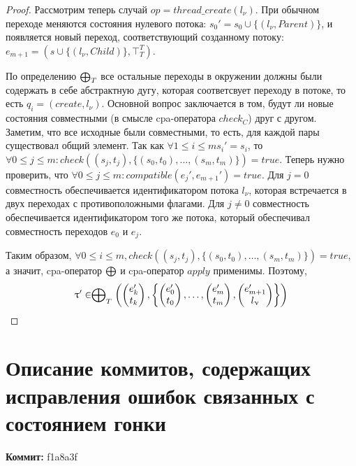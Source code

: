 \begin{proof}
Рассмотрим теперь случай $op = thread\_create(l_{\nu})$.
При обычном переходе меняются состояния нулевого потока: $s_0' = s_0 \cup \{(l_{\nu}, Parent)\}$, и появляется новый переход, соответствующий созданному потоку: $e_{m+1} = (s \cup \{(l_{\nu}, Child)\} , \top^T_T)$.

По определению $\mathrel{\bigoplus}_T$ все остальные переходы в окружении должны были содержать в себе абстрактную дугу, которая соответсвует переходу в потоке, то есть $q_i = (create, l_{\nu})$.
Основной вопрос заключается в том, будут ли новые состояния совместными (в смысле cpa-оператора $check_{C}$) друг с другом.
Заметим, что все исходные были совместными, то есть, для каждой пары существовал общий элемент.
Так как $\forall 1 \le i \le m s_i' = s_i$, то $\forall 0 \le j \le m: check((s_j, t_j), \{(s_0, t_0), \dots, (s_m, t_m)\}) = true$.
Теперь нужно проверить, что $\forall 0 \le j \le m: compatible(e_j', e_{m+1}')=true$.
Для $j=0$ совместность обеспечивается идентификатором потока $l_{\nu}$, которая встречается в двух переходах с противоположными флагами.
Для $j\neq 0$ совместность обеспечивается идентификатором того же потока, который обеспечивал совместность переходов $e_0$ и $e_j$.

Таким образом, $\forall 0 \le i \le m, check((s_j, t_j), \{(s_0, t_0), \dots, (s_m, t_m)\}) = true$, а значит, cpa-оператор $\mathrel{\bigoplus}$ и cpa-оператор $apply$ применимы.
Поэтому, 
$$\uptau' \in  \mathrel{\bigoplus}_{T}
\left(
\begin{pmatrix}
e'_k \\
t_k 
\end{pmatrix},
\left\{
\begin{pmatrix}
e'_0 \\
t_0 
\end{pmatrix},
\dots ,
\begin{pmatrix}
e'_m \\
t_m 
\end{pmatrix} ,
\begin{pmatrix}
e'_{m+1} \\
l_{\upnu} 
\end{pmatrix}
\right\}
\right)$$

\end{proof}

\chapter{Описание коммитов, содержащих исправления ошибок связанных с состоянием гонки}
\label{sect_commits_desc}

\textbf{Коммит:} f1a8a3f

